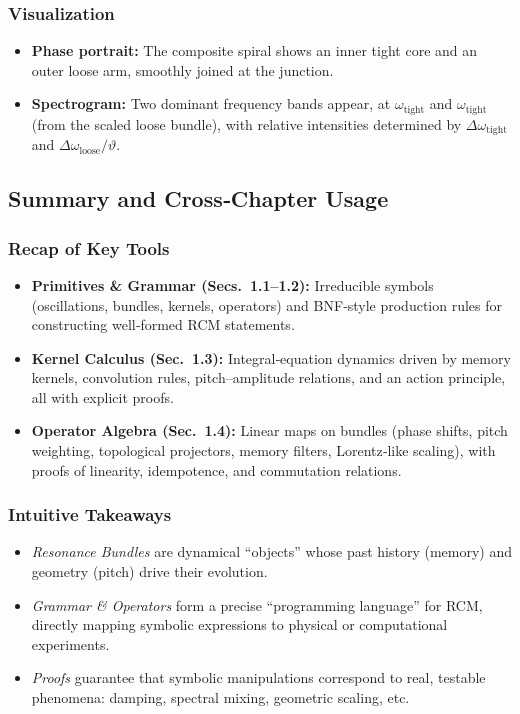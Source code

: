 \subsubsection{Visualization}

\begin{itemize}
  \item \textbf{Phase portrait:} The composite spiral shows an inner tight core and an outer loose arm, smoothly joined at the junction.
  \item \textbf{Spectrogram:} Two dominant frequency bands appear, at $\omega_{\mathrm{tight}}$ and $\omega_{\mathrm{tight}}$ (from the scaled loose bundle), with relative intensities determined by $\Delta\omega_{\mathrm{tight}}$ and $\Delta\omega_{\mathrm{loose}}/\vartheta$.
\end{itemize}
\subsection{Summary and Cross‐Chapter Usage}

\subsubsection{Recap of Key Tools}
\begin{itemize}
  \item \textbf{Primitives \& Grammar (Secs.\ 1.1–1.2):}  
    Irreducible symbols (oscillations, bundles, kernels, operators) and BNF‐style production rules for constructing well‐formed RCM statements.
  \item \textbf{Kernel Calculus (Sec.\ 1.3):}  
    Integral‐equation dynamics driven by memory kernels, convolution rules, pitch–amplitude relations, and an action principle, all with explicit proofs.
  \item \textbf{Operator Algebra (Sec.\ 1.4):}  
    Linear maps on bundles (phase shifts, pitch weighting, topological projectors, memory filters, Lorentz‐like scaling), with proofs of linearity, idempotence, and commutation relations.
\end{itemize}

\subsubsection{Intuitive Takeaways}
\begin{itemize}
  \item \emph{Resonance Bundles} are dynamical “objects” whose past history (memory) and geometry (pitch) drive their evolution.
  \item \emph{Grammar \& Operators} form a precise “programming language” for RCM, directly mapping symbolic expressions to physical or computational experiments.
  \item \emph{Proofs} guarantee that symbolic manipulations correspond to real, testable phenomena: damping, spectral mixing, geometric scaling, etc.
\end{itemize}

